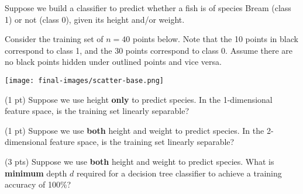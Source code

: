 \documentclass[twoside,12pt]{article}
\begin{document}
\begin{probset}



\newpage

\begin{prob}[(20 pts)]

Suppose we build a classifier to predict whether a fish is of species Bream (class 1) or not (class 0), given its height and/or weight.

Consider the training set of $n=40$ points below. Note that the 10 points in black correspond to class 1, and the 30  points correspond to class 0. Assume there are no black points hidden under outlined points and vice versa.

\begin{center}
\texttt{[image: final-images/scatter-base.png]}
\end{center}

\begin{subprobset}

\begin{subprob}(1 pt) Suppose we use height \textbf{only} to predict species. In the 1-dimensional feature space, is the training set linearly separable?


    
\end{subprob}

\vspace{0.2in}

\begin{subprob}(1 pt) Suppose we use \textbf{both} height and weight to predict species. In the 2-dimensional feature space, is the training set linearly separable?


    
\end{subprob}

\vspace{0.2in}

\begin{subprob}(3 pts) Suppose we use \textbf{both} height and weight to predict species. What is \textbf{minimum} depth $d$ required for a decision tree classifier to achieve a training accuracy of 100\%?


\end{subprob}
\end{subprobset}
\end{prob}
\end{probset}
\end{document}
